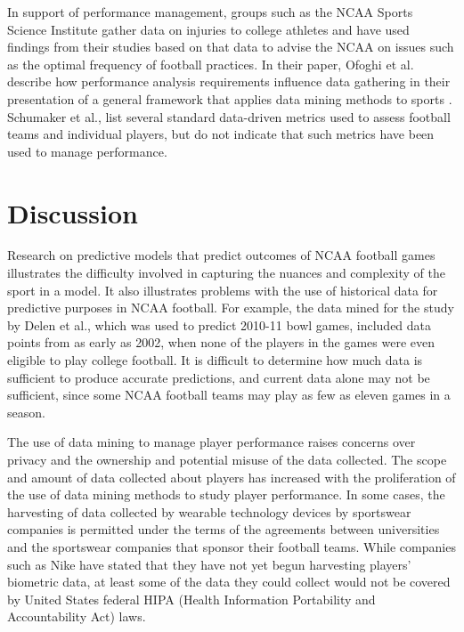 \documentclass[sigconf]{acmart}
\begin{document}
In support of performance management, groups such as the NCAA Sports Science Institute gather data on injuries to college athletes and have used findings from their studies based on that data to advise the NCAA on issues such as the optimal frequency of football practices\cite{Solomon2017}. In their paper, Ofoghi et al. describe how performance analysis requirements influence data gathering in their presentation of a general framework that applies data mining methods to sports \cite{Ofoghi2013}. Schumaker et al., list several standard data-driven metrics used to assess football teams and individual players, but do not indicate that such metrics have been used to manage performance\cite{Shumaker2010}.

\section{Discussion}
	Research on predictive models that predict outcomes of NCAA football games illustrates the difficulty involved in capturing the nuances and complexity of the sport in a model. It also illustrates problems with the use of historical data for predictive purposes in NCAA football. For example, the data mined for the study by Delen et al., which was used to predict 2010-11 bowl games, included data points from as early as 2002, when none of the players in the games were even eligible to play college football. It is difficult to determine how much data is sufficient to produce accurate predictions, and current data alone may not be sufficient, since some NCAA football teams may play as few as eleven games in a season.
	
The use of data mining to manage player performance raises concerns over privacy and the ownership and potential misuse of the data collected\cite{Taylor2017}. The scope and amount of data collected about players has increased with the proliferation of the use of data mining methods to study player performance. In some cases, the harvesting of data collected by wearable technology devices by sportswear companies is permitted under the terms of the agreements between universities and the sportswear companies that sponsor their football teams. While companies such as Nike have stated that they have not yet begun harvesting players' biometric data, at least some of the data they could collect would not be covered by United States federal HIPA (Health Information Portability and Accountability Act) laws\cite{Tracy2016}.
\end{document}
